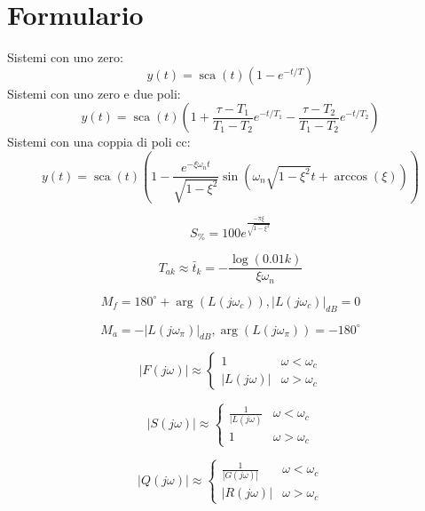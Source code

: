 \documentclass[answers, a4paper, 11pt]{exam}
\DeclareMathOperator{\sca}{sca}
\begin{document}
\section{Formulario}
\begin{multicols}{2}
Sistemi con uno zero:
\begin{equation}
y(t) =\sca(t)(1 - e^{-t/T})
\end{equation}
Sistemi con uno zero e due poli:
\begin{equation}
y(t) = \sca(t)(1 + \frac{\tau - T_1}{T_1 - T_2} e^{-t/T_1} - \frac{\tau - T_2}{T_1 - T_2} e^{-t/T_2})
\end{equation}
Sistemi con una coppia di poli cc:
\begin{equation}
y(t) = \sca(t)(1 -  \frac{e^{-\xi \omega_n t}}{\sqrt{1 - \xi^2}}  \sin(\omega_n\sqrt{1 - \xi^2} t + \arccos(\xi)))
\end{equation}

\begin{equation}
S_\% = 100e^\frac{-\pi\xi}{\sqrt{1 - \xi^2}}
\end{equation}

\begin{equation}
 T_{ak} \approx \bar{t}_{k} = -\frac{\log(0.01 k)}{\xi \omega_n}
\end{equation}

\begin{equation}
M_f = 180^\circ + \arg(L(j\omega_c)), |L(j\omega_c)|_{dB} = 0
\end{equation}

\begin{equation}
M_a = - |L(j\omega_\pi)|_{dB}, \arg(L(j\omega_\pi)) = -180^\circ
\end{equation}

\begin{equation}
|F(j\omega)| \approx \begin{cases}1 & \omega < \omega_c\\ |L(j\omega)| & \omega > \omega_c\end{cases}
\end{equation}

\begin{equation}
|S(j\omega)| \approx \begin{cases} \frac{1}{|L(j\omega)} & \omega < \omega_c \\ 1 & \omega > \omega_c \end{cases}
\end{equation}

\begin{equation}
|Q(j\omega)| \approx \begin{cases} \frac{1}{|G(j\omega)|} & \omega < \omega_c \\ |R(j\omega)| & \omega > \omega_c \end{cases}
\end{equation}


\end{multicols}
\end{document}
